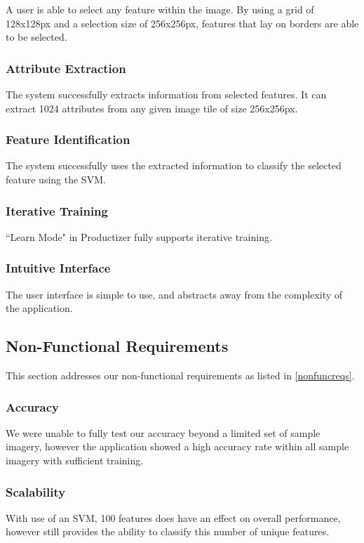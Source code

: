 A user is able to select any feature within the image. By using a grid of 128x128px and a selection size of 256x256px, features that lay on borders are able to be selected.

\subsubsection{Attribute Extraction}

The system successfully extracts information from selected features. It can extract 1024 attributes from any given image tile of size 256x256px. 

\subsubsection{Feature Identification}

The system successfully uses the extracted information to classify the selected feature using the SVM.

\subsubsection{Iterative Training}

``Learn Mode" in Productizer fully supports iterative training.

\subsubsection{Intuitive Interface}
The user interface is simple to use, and abstracts away from the complexity of the application.

\subsection{Non-Functional Requirements}

This section addresses our non-functional requirements as listed in \ref{nonfuncreqs}.

\subsubsection{Accuracy}
We were unable to fully test our accuracy beyond a limited set of sample imagery, however the application showed a high accuracy rate within all sample imagery with sufficient training.

\subsubsection{Scalability}
With use of an SVM, 100 features does have an effect on overall performance, however still provides the ability to classify this number of unique features.

